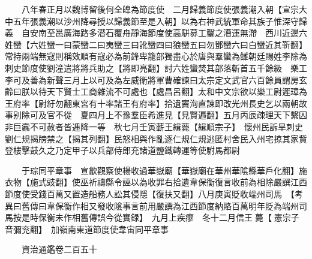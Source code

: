 　　八年春正月以魏博留後何全皥為節度使　二月歸義節度使張義潮入朝【宣宗大中五年張義潮以沙州降尋授以歸義節至是入朝】以為右神武統軍命其族子惟深守歸義　自安南至邕廣海路多潜石覆舟靜海節度使高駢募工鑿之漕運無滯　西川近邊六姓蠻【六姓蠻一曰蒙蠻二曰夷蠻三曰訛蠻四曰狼蠻五曰勿鄧蠻六曰白蠻近其靳翻】常持兩端無寇則稱效順有寇必為前鋒卑籠部獨盡心於唐與羣蠻為讎朝廷賜姓李除為刺史節度使劉潼遣將將兵助之【將即亮翻】討六姓蠻焚其部落斬首五千餘級　樂工李可及善為新聲三月上以可及為左威衛將軍曹確諫曰太宗定文武官六百餘員謂房玄齡曰朕以待天下賢士工商雜流不可處也【處昌呂翻】太和中文宗欲以樂工尉遲璋為王府率【尉紆勿翻東宮有十率諸王有府率】拾遺竇洵直諫即改光州長史乞以兩朝故事别除可及官不從　夏四月上不豫羣臣希進見【見賢遍翻】五月丙辰疎理天下繫囚非巨蠧不可赦者皆逓降一等　秋七月壬寅蘄王緝薨【緝順宗子】　懷州民訴旱刺史劉仁規揭牓禁之【揭其列翻】民怒相與作亂逐仁規仁規逃匿村舍民入州宅掠其家貲登樓擊鼓久之乃定甲子以兵部侍郎充諸道鹽鐵轉運等使駙馬都尉

　　于琮同平章事　宣歙觀察使楊收過華嶽廟【華嶽廟在華州華隂縣華戶化翻】施衣物【施式豉翻】使巫祈禱縣令誣以為收罪右拾遺韋保衡復言收前為相除嚴譔江西節度使受錢百萬又置造船務人訟其侵隱【復扶又翻】八月庚寅貶收端州司馬　【考異曰舊傳曰韋保衡作相又發收隂事言前用嚴譔為江西節度納賂百萬明年貶為端州司馬按是時保衡未作相舊傳誤今從實録】　九月上疾瘳　冬十二月信王薨【憲宗子音彌兖翻】　加嶺南東道節度使韋宙同平章事

　　資治通鑑卷二百五十


    


 


 



 

 
  







 


　　
　　
　
　
　


　　

　















	
	









































